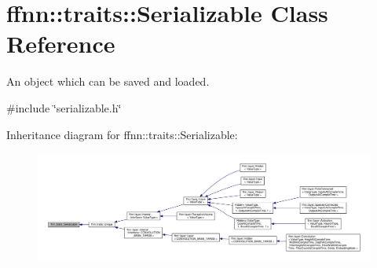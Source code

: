 \hypertarget{classffnn_1_1traits_1_1_serializable}{\section{ffnn\-:\-:traits\-:\-:Serializable Class Reference}
\label{classffnn_1_1traits_1_1_serializable}
}


An object which can be saved and loaded.  




{\ttfamily \#include \char`\"{}serializable.\-h\char`\"{}}



Inheritance diagram for ffnn\-:\-:traits\-:\-:Serializable\-:\nopagebreak
\begin{figure}[H]
\begin{center}
\leavevmode
\includegraphics[width=350pt]{classffnn_1_1traits_1_1_serializable__inherit__graph}
\end{center}
\end{figure}

